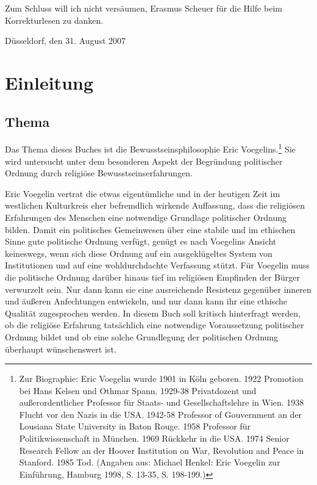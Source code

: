 Zum Schluss will ich nicht versäumen, Erasmus Scheuer für die Hilfe beim
Korrekturlesen zu danken.

\begin{flushright}Düsseldorf, den 31. August 2007\end{flushright}

\chapter{Einleitung}


\section{Thema}

Das Thema dieses Buches ist die Bewusstseinsphilosophie Eric
Voegelins.\footnote{Zur Biographie: Eric Voegelin wurde 1901 in Köln geboren.
  1922 Promotion bei Hans Kelsen und Othmar Spann. 1929-38 Privatdozent und
  außerordentlicher Professor für Staats- und Gesellschaftslehre in Wien. 1938
  Flucht vor den Nazis in die USA.  1942-58 Professor of Gouvernment an der
  Lousiana State University in Baton Rouge.  1958 Professor für
  Politikwissenschaft in München. 1969 Rückkehr in die USA.  1974 Senior
  Research Fellow an der Hoover Institution on War, Revolution and Peace in
  Stanford. 1985 Tod. (Angaben aus: Michael Henkel: Eric Voegelin zur
  Einführung, Hamburg 1998, S. 13-35, S. 198-199.)} Sie wird untersucht unter
dem besonderen Aspekt der Begründung politischer Ordnung durch religiöse
Bewusstseinserfahrungen.

Eric Voegelin vertrat die etwas eigentümliche und in der heutigen Zeit im
westlichen Kulturkreis eher befremdlich wirkende Auf\/fassung, dass die
religiösen Erfahrungen des Menschen eine notwendige Grundlage politischer
Ordnung bilden.  Damit ein politisches Gemeinwesen über eine stabile und im
ethischen Sinne gute politische Ordnung verfügt, genügt es nach Voegelins
Ansicht keineswegs, wenn sich diese Ordnung auf ein ausgeklügeltes System von
Institutionen und auf eine wohldurchdachte Verfassung stützt. Für Voegelin
muss die politische Ordnung darüber hinaus tief im religiösen Empfinden der
Bürger verwurzelt sein. Nur dann kann sie eine ausreichende Resistenz
gegenüber inneren und äußeren Anfechtungen entwickeln, und nur dann kann ihr
eine ethische Qualität zugesprochen werden. In diesem Buch soll kritisch
hinterfragt werden, ob die religiöse Erfahrung tatsächlich eine notwendige
Voraussetzung politischer Ordnung bildet und ob eine solche Grundlegung der
politischen Ordnung überhaupt wünschenswert ist.

